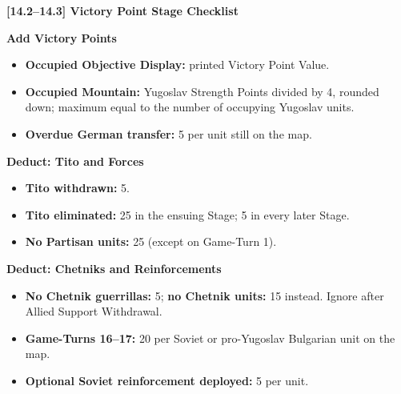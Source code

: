 \documentclass[10pt,letterpaper]{article}
\newcommand{\aidheading}[1]{%
  \par\vspace{4pt}%
  {\sffamily\bfseries\large\color{TitoInk}#1\par}%
  \vspace{1.5pt}{\color{TitoRule}\hrule height 0.5pt}\vspace{4pt}%
}
\begin{document}
\vspace{3pt}
\aidheading{[14.2--14.3] Victory Point Stage Checklist}
\begingroup
\scriptsize
\begin{minipage}[t]{0.315\textwidth}
  \vspace{0pt}
  {\sffamily\bfseries\color{TitoInk}Add Victory Points\par}
  \begin{itemize}[leftmargin=1.1em,itemsep=1pt,topsep=2pt]
    \item \textbf{Occupied Objective Display:} printed Victory Point Value.
    \item \textbf{Occupied Mountain:} Yugoslav Strength Points divided by 4,
      rounded down; maximum equal to the number of occupying Yugoslav units.
    \item \textbf{Overdue German transfer:} 5 per unit still on the map.
  \end{itemize}
\end{minipage}
\hfill
\begin{minipage}[t]{0.315\textwidth}
  \vspace{0pt}
  {\sffamily\bfseries\color{TitoInk}Deduct: Tito and Forces\par}
  \begin{itemize}[leftmargin=1.1em,itemsep=1pt,topsep=2pt]
    \item \textbf{Tito withdrawn:} 5.
    \item \textbf{Tito eliminated:} 25 in the ensuing Stage; 5 in every later
      Stage.
    \item \textbf{No Partisan units:} 25 (except on Game-Turn 1).
  \end{itemize}
\end{minipage}
\hfill
\begin{minipage}[t]{0.335\textwidth}
  \vspace{0pt}
  {\sffamily\bfseries\color{TitoInk}Deduct: Chetniks and Reinforcements\par}
  \begin{itemize}[leftmargin=1.1em,itemsep=1pt,topsep=2pt]
    \item \textbf{No Chetnik guerrillas:} 5; \textbf{no Chetnik units:} 15
      instead. Ignore after Allied Support Withdrawal.
    \item \textbf{Game-Turns 16--17:} 20 per Soviet or pro-Yugoslav Bulgarian
      unit on the map.
    \item \textbf{Optional Soviet reinforcement deployed:} 5 per unit.
  \end{itemize}
\end{minipage}
\end{document}
